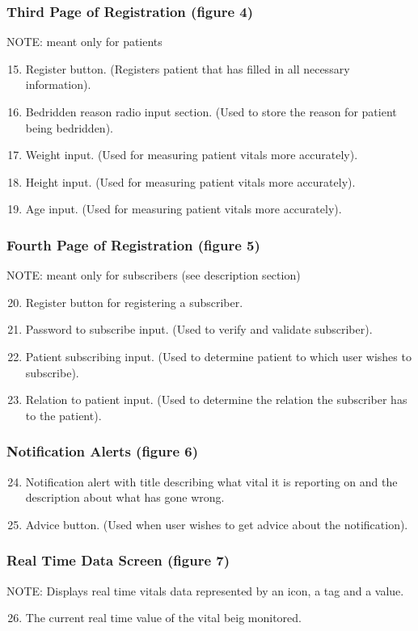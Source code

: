 \subsubsection{Third Page of Registration (figure 4)}
NOTE: meant only for patients
\begin{enumerate}
\setcounter{enumi}{14}
	\item Register button. (Registers patient that has filled in all necessary information). 
	\item Bedridden reason radio input section. (Used to store the reason for patient being bedridden). 
	\item Weight input. (Used for measuring patient vitals more accurately). 
	\item Height input. (Used for measuring patient vitals more accurately). 
	\item Age input. (Used for measuring patient vitals more accurately). 
\end{enumerate}
\subsubsection{Fourth Page of Registration (figure 5)}
NOTE: meant only for subscribers (see description section)
\begin{enumerate}
\setcounter{enumi}{19}
	\item Register button for registering a subscriber. 
	\item Password to subscribe input. (Used to verify and validate subscriber). 
	\item Patient subscribing input. (Used to determine patient to which user wishes to subscribe). 
	\item Relation to patient input. (Used to determine the relation the subscriber has to the patient). 
\end{enumerate}
\subsubsection{Notification Alerts (figure 6)}
\begin{enumerate}
\setcounter{enumi}{23}
	\item Notification alert with title describing what vital it is reporting on and the description about what has gone wrong. 
	\item Advice button. (Used when user wishes to get advice about the notification).   
\end{enumerate}
\subsubsection{Real Time Data Screen (figure 7)}
NOTE:  Displays real time vitals data represented by an icon, a tag and a value.
\begin{enumerate}
\setcounter{enumi}{25}
	\item The current real time value of the vital beig monitored. 
\end{enumerate}

